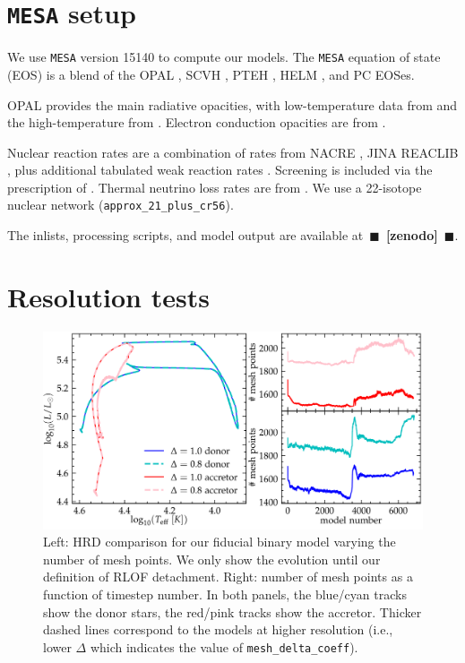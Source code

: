 \documentclass[twocolumn,twocolappendix,trackchanges]{aastex63}
\newcommand{\code}[1]{\texttt{#1}}
\newcommand{\todo}[1]{{\large $\blacksquare$~\textbf{\color{red}[#1]}}~$\blacksquare$}
\begin{document}





\appendix

\section{\texttt{MESA} setup}
\label{sec:software}

We use \code{MESA} version 15140 to compute our models.  The
\code{MESA} equation of state (EOS) is a blend of the OPAL \citet{Rogers2002}, SCVH
\citet{Saumon1995}, PTEH \citet{Pols1995}, HELM \citet{Timmes2000},
and PC \citet{Potekhin2010} EOSes.

OPAL \citep{Iglesias1993, Iglesias1996} provides the main radiative
opacities, with low-temperature data from \citet{Ferguson2005} and the
high-temperature from \citet{Buchler1976}. Electron conduction
opacities are from \citet{Cassisi2007}.

Nuclear reaction rates are a combination of rates from NACRE
\citep{Angulo1999}, JINA REACLIB \citep{Cyburt2010}, plus additional
tabulated weak reaction rates \citet{Fuller1985, Oda1994,
  Langanke2000}. Screening is included via the prescription of
\citet{Chugunov2007}.  Thermal neutrino loss rates are from
\citet{Itoh1996}. We use a
22-isotope nuclear network (\texttt{approx\_21\_plus\_cr56}).

The inlists, processing scripts, and model output are available at~\todo{zenodo}.

\section{Resolution tests}
\label{sec:res_tests}


\begin{figure}[htbp]
  \centering
  \includegraphics[width=\textwidth]{spatial_res_plot}
  \caption{Left: HRD comparison for our fiducial binary model varying
  the number of mesh points. We only show the evolution until our definition
  of RLOF detachment. Right: number of mesh points as a
  function of timestep number. In both panels, the blue/cyan tracks show the donor stars, the
red/pink tracks show the accretor. Thicker dashed lines correspond to
the models at higher resolution (i.e., lower $\Delta$ which indicates
the value of \texttt{mesh\_delta\_coeff}).}
\label{fig:sp_test}
\end{figure}
\end{document}
